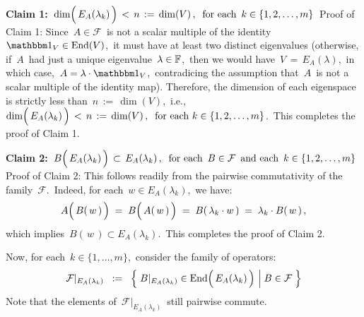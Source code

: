 \begin{enumerate}
    \vskip 0.2cm
    \noindent
    \textbf{Claim 1:}\;
    \,$
    \dim\!\left(\,\overset{{\color{white}.}}{E_{A}(\lambda_{k})}\,\right) \,<\, n \,:=\, \dim(V)\,,
    \;\;
    \textnormal{for each \,$k \in \{1,2,\ldots,m\}$}
    $\,
    \vskip -0.1cm
    \noindent
    Proof of Claim 1:\;
    Since \,$A \in \mathcal{F}$\, is not a scalar multiple of the identity \,$\id_{V} \in \End(V)$,\,
    it must have at least two distinct eigenvalues
    (otherwise, if \,$A$\, had just a unique eigenvalue \,$\lambda \in \mathbb{F}$,\,
    then we would have \,$V \,=\, E_{A}(\lambda)$,\, in which case, \,$A = \lambda \cdot \id_{V}$,\,
    contradicing the assumption that \,$A$\, is not a scalar multiple of the identity map).
    Therefore, the dimension of each eigenspace is strictly less than \,$n \,:=\, \dim(V)$,\, i.e.,
    \,$
    \dim\!\left(\,\overset{{\color{white}.}}{E_{A}(\lambda_{k})}\,\right) \,<\, n \,:=\, \dim(V)\,,
    \;\;
    \textnormal{for each $k \in \{1,2,\ldots,m\}$}
    $.\,
    This completes the proof of Claim 1.

    \vskip 0.3cm
    \noindent
    \textbf{Claim 2:}\;
    \,$
    B\!\left(\,\overset{{\color{white}.}}{E_{A}(\lambda_{k})}\,\right) \,\subset\, E_{A}(\lambda_{k})\,,
    \;\;
    \textnormal{for each \,$B \in \mathcal{F}$\, and each \,$k \in \{1,2,\ldots,m\}$}
    $\,
    \vskip -0.1cm
    \noindent
    Proof of Claim 2:\;
    This follows readily from the pairwise commutativity of the family \,$\mathcal{F}$.\,
    Indeed, for each \,$w \in E_{A}(\lambda_{k})$,\, we have:
    \begin{equation*}
    A\!\left(\,\overset{{\color{white}.}}{B(\,w\,)}\,\right)
    \; = \;
        B\!\left(\,\overset{{\color{white}.}}{A(\,w\,)}\,\right)
    \; = \;
        B(\,\lambda_{k} \cdot w\,)
    \; = \;
        \lambda_{k} \cdot B(\,w\,)\,,
    \end{equation*}
    which implies \,$B(\,w\,) \subset E_{A}(\lambda_{k})$.\,
    This completes the proof of Claim 2.

    \vskip 0.3cm
    \noindent
    Now, for each \,$k \in \{1,\ldots,m\}$,\, consider the family of operators:
    \begin{equation*}
    \mathcal{F}\vert_{E_{A}(\lambda_{k})}
    \;\; := \;\;
        \left\{\;
            B\vert_{E_{A}(\lambda_{k})} \in \End\!\left(\,\overset{{\color{white}.}}{E_{A}(\lambda_{k})}\,\right)
            \,\left\vert\;
            \overset{{\color{white}.}}{B \in \mathcal{F}}
            \right.
            \,\right\}
    \end{equation*}
    Note that the elements of \,$\mathcal{F}\vert_{E_{A}(\lambda_{k})}$\,
    still pairwise commute.


\end{enumerate}
